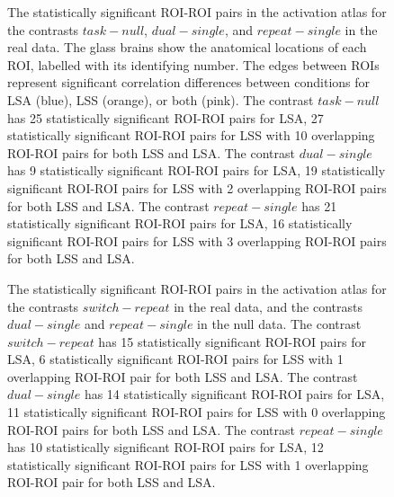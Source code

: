\documentclass[phd,appendix,figures]{uithesis}
\begin{document}
\begin{figure}[H]
  \centering



  \caption{
   The statistically significant ROI-ROI pairs in the activation atlas for the contrasts $task - null$, $dual - single$,
   and $repeat - single$ in the real data.
   The glass brains show the anatomical locations of each ROI,
   labelled with its identifying number.
   The edges between ROIs represent significant correlation differences
   between conditions for LSA (blue), LSS (orange), or both (pink).
   The contrast $task - null$ has 25 statistically significant ROI-ROI
   pairs for LSA, 27 statistically significant ROI-ROI pairs
   for LSS with 10 overlapping ROI-ROI pairs for both LSS and LSA.
   The contrast $dual - single$ has 9 statistically significant ROI-ROI
   pairs for LSA, 19 statistically significant ROI-ROI pairs
   for LSS with 2 overlapping ROI-ROI pairs for both LSS and LSA.
   The contrast $repeat - single$ has 21 statistically significant ROI-ROI
   pairs for LSA, 16 statistically significant ROI-ROI pairs
   for LSS with 3 overlapping ROI-ROI pairs for both LSS and LSA.
  }
  \label{fig:significant-contrasts1}
\end{figure}

\begin{figure}[H]
  \ContinuedFloat
  \centering



  \caption{
      The statistically significant ROI-ROI pairs in the activation atlas for the contrasts
      $switch - repeat$ in the real data, and the contrasts $dual - single$ and $repeat - single$
      in the null data.
      The contrast $switch - repeat$ has 15 statistically significant ROI-ROI
      pairs for LSA, 6 statistically significant ROI-ROI pairs
      for LSS with 1 overlapping ROI-ROI pair for both LSS and LSA.
      The contrast $dual - single$ has 14 statistically significant ROI-ROI
      pairs for LSA, 11 statistically significant ROI-ROI pairs
      for LSS with 0 overlapping ROI-ROI pairs for both LSS and LSA.
      The contrast $repeat - single$ has 10 statistically significant ROI-ROI
      pairs for LSA, 12 statistically significant ROI-ROI pairs
      for LSS with 1 overlapping ROI-ROI pair for both LSS and LSA.
  }
  \label{fig:significant-contrasts2}
\end{figure}
\end{document}
